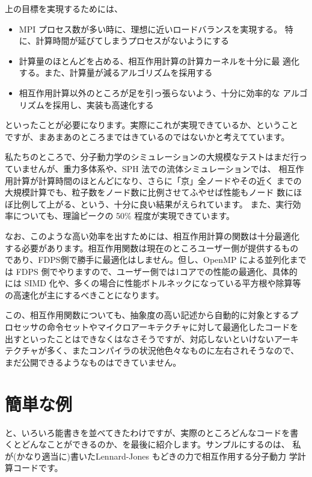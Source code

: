 \documentclass[twocolumn,10pt]{jarticle}
\begin{document}
上の目標を実現するためには、

\begin{itemize}

  \item MPI プロセス数が多い時に、理想に近いロードバランスを実現する。
    特に、計算時間が延びてしまうプロセスがないようにする
  \item 計算量のほとんどを占める、相互作用計算の計算カーネルを十分に最
    適化する。また、計算量が減るアルゴリズムを採用する
  \item 相互作用計算以外のところが足を引っ張らないよう、十分に効率的な
    アルゴリズムを採用し、実装も高速化する

\end{itemize}  

といったことが必要になります。実際にこれが実現できているか、ということ
ですが、まあまあのところまではきているのではないかと考えてています。

私たちのところで、分子動力学のシミュレーションの大規模なテストはまだ行っ
ていませんが、重力多体系や、SPH 法での流体シミュレーションでは、
相互作用計算が計算時間のほとんどになり、さらに「京」全ノードやその近く
までの大規模計算でも、粒子数をノード数に比例させてふやせば性能もノード
数にほぼ比例して上がる、という、十分に良い結果がえられています。
また、実行効率についても、理論ピークの 50\% 程度が実現できています。

なお、このような高い効率を出すためには、相互作用計算の関数は十分最適化
する必要があります。相互作用関数は現在のところユーザー側が提供するもの
であり、FDPS側で勝手に最適化はしません。但し、OpenMP による並列化まで
は FDPS 側でやりますので、ユーザー側では1コアでの性能の最適化、具体的
には SIMD 化や、多くの場合に性能ボトルネックになっている平方根や除算等
の高速化が主にするべきことになります。

この、相互作用関数についても、抽象度の高い記述から自動的に対象とするプ
ロセッサの命令セットやマイクロアーキテクチャに対して最適化したコードを
出すといったことはできなくはなさそうですが、対応しないといけないアーキ
テクチャが多く、またコンパイラの状況他色々なものに左右されそうなので、
まだ公開できるようなものはできていません。

\section{簡単な例}

と、いろいろ能書きを並べてきたわけですが、実際のところどんなコードを書
くとどんなことができるのか、を最後に紹介します。サンプルにするのは、
私が(かなり適当に)書いたLennard-Jones もどきの力で相互作用する分子動力
学計算コードです。
\end{document}
